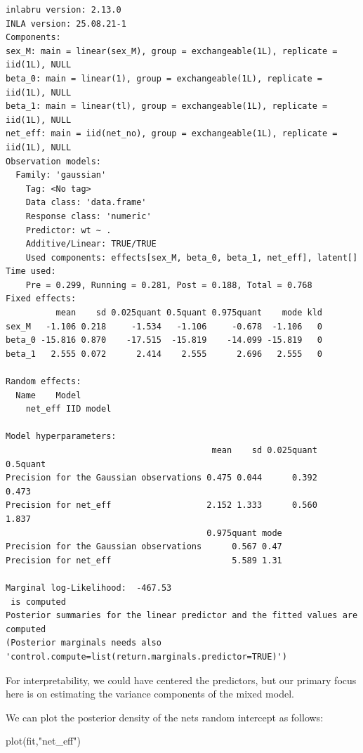 \documentclass[
  letterpaper,
  DIV=11,
  numbers=noendperiod]{scrartcl}
\newenvironment{Shaded}{\begin{snugshade}}{\end{snugshade}}
\newcommand{\FunctionTok}[1]{\textcolor[rgb]{0.28,0.35,0.67}{#1}}
\newcommand{\NormalTok}[1]{\textcolor[rgb]{0.00,0.23,0.31}{#1}}
\newcommand{\StringTok}[1]{\textcolor[rgb]{0.13,0.47,0.30}{#1}}
\begin{document}
\begin{verbatim}
inlabru version: 2.13.0
INLA version: 25.08.21-1
Components:
sex_M: main = linear(sex_M), group = exchangeable(1L), replicate = iid(1L), NULL
beta_0: main = linear(1), group = exchangeable(1L), replicate = iid(1L), NULL
beta_1: main = linear(tl), group = exchangeable(1L), replicate = iid(1L), NULL
net_eff: main = iid(net_no), group = exchangeable(1L), replicate = iid(1L), NULL
Observation models:
  Family: 'gaussian'
    Tag: <No tag>
    Data class: 'data.frame'
    Response class: 'numeric'
    Predictor: wt ~ .
    Additive/Linear: TRUE/TRUE
    Used components: effects[sex_M, beta_0, beta_1, net_eff], latent[]
Time used:
    Pre = 0.299, Running = 0.281, Post = 0.188, Total = 0.768 
Fixed effects:
          mean    sd 0.025quant 0.5quant 0.975quant    mode kld
sex_M   -1.106 0.218     -1.534   -1.106     -0.678  -1.106   0
beta_0 -15.816 0.870    -17.515  -15.819    -14.099 -15.819   0
beta_1   2.555 0.072      2.414    2.555      2.696   2.555   0

Random effects:
  Name    Model
    net_eff IID model

Model hyperparameters:
                                         mean    sd 0.025quant 0.5quant
Precision for the Gaussian observations 0.475 0.044      0.392    0.473
Precision for net_eff                   2.152 1.333      0.560    1.837
                                        0.975quant mode
Precision for the Gaussian observations      0.567 0.47
Precision for net_eff                        5.589 1.31

Marginal log-Likelihood:  -467.53 
 is computed 
Posterior summaries for the linear predictor and the fitted values are computed
(Posterior marginals needs also 'control.compute=list(return.marginals.predictor=TRUE)')
\end{verbatim}

For interpretability, we could have centered the predictors, but our
primary focus here is on estimating the variance components of the mixed
model.

We can plot the posterior density of the nets random intercept as
follows:

\begin{Shaded}
\begin{Highlighting}[]
\FunctionTok{plot}\NormalTok{(fit,}\StringTok{"net\_eff"}\NormalTok{)}
\end{Highlighting}
\end{Shaded}
\end{document}
